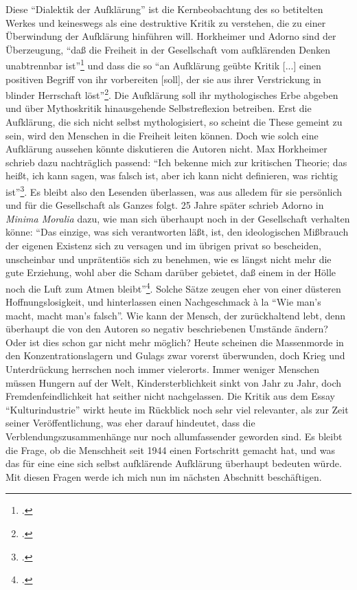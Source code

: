 \documentclass[a4paper, 12pt]{article}
\begin{document}
\begin{onehalfspace}
Diese "`Dialektik der Aufklärung"' ist die Kernbeobachtung des so betitelten Werkes und keineswegs als eine destruktive Kritik zu verstehen, die zu einer Überwindung der Aufklärung hinführen will. Horkheimer und Adorno sind der Überzeugung, "`daß die Freiheit in der Gesellschaft vom aufklärenden Denken unabtrennbar ist"'\footnote{\Cite[Siehe][S. 3]{dialektik-der-aufklaerung}.} und dass die so "`an Aufklärung geübte Kritik [...] einen positiven Begriff von ihr vorbereiten [soll], der sie aus ihrer Verstrickung in blinder Herrschaft löst"'\footnote{\Cite[Siehe][S. 6]{dialektik-der-aufklaerung}.}. Die Aufklärung soll ihr mythologisches Erbe abgeben und über Mythoskritik hinausgehende Selbstreflexion betreiben. Erst die Aufklärung, die sich nicht selbst mythologisiert, so scheint die These gemeint zu sein, wird den Menschen in die Freiheit leiten können. Doch wie solch eine Aufklärung aussehen könnte diskutieren die Autoren nicht. Max Horkheimer schrieb dazu nachträglich passend: "`Ich bekenne mich zur kritischen Theorie; das heißt, ich kann sagen, was falsch ist, aber ich kann nicht definieren, was richtig ist"'\footnote{\Cite[Siehe][S. 150]{gesellschaft}.}. Es bleibt also den Lesenden überlassen, was aus alledem für sie persönlich und für die Gesellschaft als Ganzes folgt. 25 Jahre später schrieb Adorno in \emph{Minima Moralia} dazu, wie man sich überhaupt noch in der Gesellschaft verhalten könne: "`Das einzige, was sich verantworten läßt, ist, den ideologischen Mißbrauch der eigenen Existenz sich zu versagen und im übrigen privat so bescheiden, unscheinbar und unprätentiös sich zu benehmen, wie es längst nicht mehr die gute Erziehung, wohl aber die Scham darüber gebietet, daß einem in der Hölle noch die Luft zum Atmen bleibt"'\footnote{\Cite[Siehe][S. 24]{minima}.}. Solche Sätze zeugen eher von einer düsteren Hoffnungslosigkeit, und hinterlassen einen Nachgeschmack \`{a} la "`Wie man's macht, macht man's falsch"'. Wie kann der Mensch, der zurückhaltend lebt, denn überhaupt die von den Autoren so negativ beschriebenen Umstände ändern? Oder ist dies schon gar nicht mehr möglich? Heute scheinen die Massenmorde in den Konzentrationslagern und Gulags zwar vorerst überwunden, doch Krieg und Unterdrückung herrschen noch immer vielerorts. Immer weniger Menschen müssen Hungern auf der Welt, Kindersterblichkeit sinkt von Jahr zu Jahr, doch Fremdenfeindlichkeit hat seither nicht nachgelassen. Die Kritik aus dem Essay "`Kulturindustrie"' wirkt heute im Rückblick noch sehr viel relevanter, als zur Zeit seiner Veröffentlichung, was eher darauf hindeutet, dass die Verblendungszusammenhänge nur noch allumfassender geworden sind. Es bleibt die Frage, ob die Menschheit seit 1944 einen Fortschritt gemacht hat, und was das für eine eine sich selbst aufklärende Aufklärung überhaupt bedeuten würde. Mit diesen Fragen werde ich mich nun im nächsten Abschnitt beschäftigen.


\end{onehalfspace}
\end{document}
